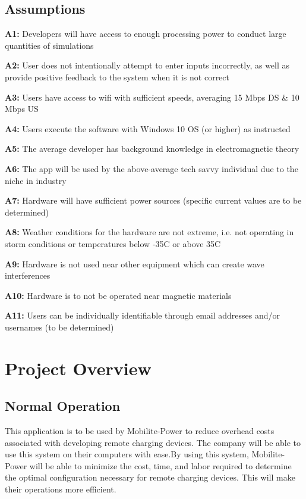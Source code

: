 \documentclass[12pt, titlepage]{article}
\begin{document}
\subsection{Assumptions}
\par 
\textbf{A1:} Developers will have access to enough processing power to conduct large quantities of simulations
\par
\textbf{A2:} User does not intentionally attempt to enter inputs incorrectly, as well as provide positive feedback to the system when it is not correct
\par
\textbf{A3:} Users have access to wifi with sufficient speeds, averaging 15 Mbps DS \& 10 Mbps US
\par
\textbf{A4:} Users execute the software with Windows 10 OS (or higher) as instructed
\par 
\textbf{A5:} The average developer has background knowledge in electromagnetic theory
\par 
\textbf{A6:} The app will be used by the above-average tech savvy individual due to the niche in industry
\par
\textbf{A7:} Hardware will have sufficient power sources (specific current values are to be determined)
\par
\textbf{A8:} Weather conditions for the hardware are not extreme, i.e. not operating in storm conditions or temperatures below -35C or above 35C
\par
\textbf{A9:} Hardware is not used near other equipment which can create wave interferences 
\par 
\textbf{A10:} Hardware is to not be operated near magnetic materials
\par
\textbf{A11:} Users can be individually identifiable through email addresses and/or usernames (to be determined)

\section{Project Overview}
\subsection{Normal Operation}

This application is to be used by Mobilite-Power to reduce overhead costs associated with developing remote charging devices. The company will be able to use this system on their computers with ease.By using this system, Mobilite-Power will be able to minimize the cost, time, and labor required to determine the optimal configuration necessary for remote charging devices. This will make their operations more efficient.
\end{document}
